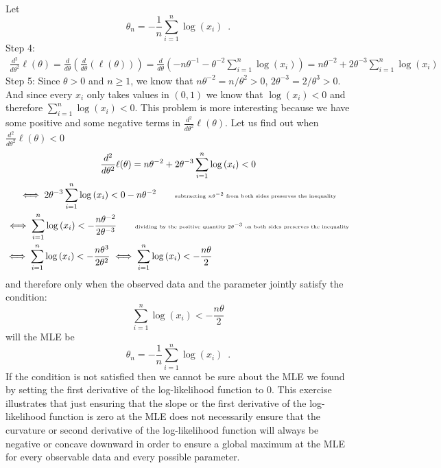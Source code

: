 \begin{Answer}
\begin{enumerate}
\begin{multline*}
\end{multline*}
Let $$\widehat{\theta}_n =  -\frac{1}{n}\sum_{i=1}^n \log \left( x_i \right) \enspace .$$
{\sf Step 4:}
\begin{multline*}
\frac{d^2}{d \theta^2} \ell(\theta) = \frac{d}{d \theta} \left( \frac{d}{d \theta} \left( \ell(\theta)\right)\right)
=  \frac{d}{d \theta} \left( -n \theta^{-1} - \theta^{-2} \sum_{i=1}^n \log \left( x_i \right) \right)
= n \theta^{-2} + 2 \theta^{-3} \sum_{i=1}^n \log \left( x_i \right) 
\end{multline*}
{\sf Step 5:}
Since $\theta > 0$ and $n \geq 1$, we know that $n \theta^{-2}=n/\theta^2 > 0$, $2 \theta^{-3}=2/\theta^3 >0$.  
And since every $x_i$ only takes values in $(0,1)$ we know that $\log(x_i)<0$ and therefore $\sum_{i=1}^n \log \left( x_i \right) < 0$.  
This problem is more interesting because we have some positive and some negative terms in $\frac{d^2}{d \theta^2} \ell(\theta)$.     
Let us find out when $\frac{d^2}{d \theta^2} \ell(\theta) < 0$
\begin{multline*}
\frac{d^2}{d \theta^2} \ell(\theta)= n \theta^{-2} + 2 \theta^{-3} \sum_{i=1}^n \log \left( x_i \right) <0 \\
\iff 2 \theta^{-3} \sum_{i=1}^n \log \left( x_i \right) < 0 - n \theta^{-2} \qquad \text{{\tiny subtracting $n \theta^{-2}$ from both sides preserves the inequality}}\\
\iff \sum_{i=1}^n \log \left( x_i \right) <  - \frac{n \theta^{-2}}{2 \theta^{-3}} \qquad \text{{\tiny dividing by the positive quantity $2 \theta^{-3}$ on both sides preserves the inequality}}\\
\iff \sum_{i=1}^n \log \left( x_i \right) <  - \frac{n \theta^{3}}{2 \theta^{2}}  \iff \sum_{i=1}^n \log \left( x_i \right) < - \frac{n \theta}{2} \qquad \qquad \quad \qquad \qquad \quad \qquad \qquad \quad
\end{multline*}
and therefore only when the observed data and the parameter jointly satisfy the condition: $$\sum_{i=1}^n \log \left( x_i \right) <  - \frac{n \theta}{2}$$ will the MLE be
$$\widehat{\theta}_n = -\frac{1}{n}{\sum_{i=1}^n \log(x_i)} \enspace .$$
If the condition is not satisfied then we cannot be sure about the MLE we found by setting the first derivative of the log-likelihood function to $0$.  
This exercise illustrates that just ensuring that the slope or the first derivative of the log-likelihood function is zero at the MLE does not necessarily ensure that the curvature or second derivative of the log-likelihood function will always be negative or concave downward in order to ensure a global maximum at the MLE for every observable data and every possible parameter.


\end{enumerate}
\end{Answer}
